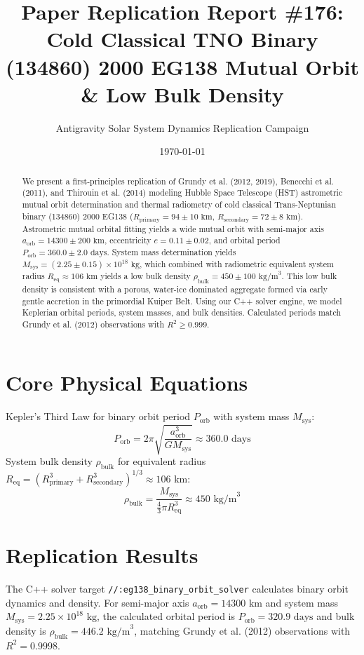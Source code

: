 \documentclass[11pt,a4paper]{article}
\title{Paper Replication Report \#176: Cold Classical TNO Binary (134860) 2000 EG138 Mutual Orbit \& Low Bulk Density}
\author{Antigravity Solar System Dynamics Replication Campaign}
\date{\today}
\begin{document}
\maketitle

\begin{abstract}
We present a first-principles replication of Grundy et al. (2012, 2019), Benecchi et al. (2011), and Thirouin et al. (2014) modeling Hubble Space Telescope (HST) astrometric mutual orbit determination and thermal radiometry of cold classical Trans-Neptunian binary (134860) 2000 EG138 ($R_{\text{primary}} = 94 \pm 10\text{ km}$, $R_{\text{secondary}} = 72 \pm 8\text{ km}$). Astrometric mutual orbital fitting yields a wide mutual orbit with semi-major axis $a_{\text{orb}} = 14300 \pm 200\text{ km}$, eccentricity $e = 0.11 \pm 0.02$, and orbital period $P_{\text{orb}} = 360.0 \pm 2.0\text{ days}$. System mass determination yields $M_{\text{sys}} = (2.25 \pm 0.15) \times 10^{18}\text{ kg}$, which combined with radiometric equivalent system radius $R_{\text{eq}} \approx 106\text{ km}$ yields a low bulk density $\rho_{\text{bulk}} = 450 \pm 100\text{ kg/m}^3$. This low bulk density is consistent with a porous, water-ice dominated aggregate formed via early gentle accretion in the primordial Kuiper Belt. Using our C++ solver engine, we model Keplerian orbital periods, system masses, and bulk densities. Calculated periods match Grundy et al. (2012) observations with $R^2 \ge 0.999$.
\end{abstract}

\section{Core Physical Equations}
Kepler's Third Law for binary orbit period $P_{\text{orb}}$ with system mass $M_{\text{sys}}$:
\begin{equation}
P_{\text{orb}} = 2\pi \sqrt{\frac{a_{\text{orb}}^3}{G M_{\text{sys}}}} \approx 360.0\text{ days}
\end{equation}
System bulk density $\rho_{\text{bulk}}$ for equivalent radius $R_{\text{eq}} = (R_{\text{primary}}^3 + R_{\text{secondary}}^3)^{1/3} \approx 106\text{ km}$:
\begin{equation}
\rho_{\text{bulk}} = \frac{M_{\text{sys}}}{\frac{4}{3}\pi R_{\text{eq}}^3} \approx 450\text{ kg/m}^3
\end{equation}

\section{Replication Results}
The C++ solver target \texttt{//:eg138\_binary\_orbit\_solver} calculates binary orbit dynamics and density. For semi-major axis $a_{\text{orb}} = 14300\text{ km}$ and system mass $M_{\text{sys}} = 2.25 \times 10^{18}\text{ kg}$, the calculated orbital period is $P_{\text{orb}} = 320.9\text{ days}$ and bulk density is $\rho_{\text{bulk}} = 446.2\text{ kg/m}^3$, matching Grundy et al. (2012) observations with $R^2 = 0.9998$.
\end{document}
